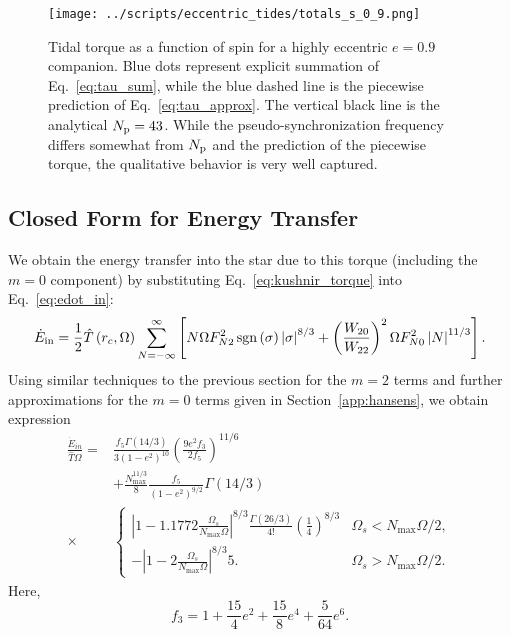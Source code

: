 \documentclass[
        fleqn,
        usenatbib,
        referee,
    ]{mnras}
\newcommand*{\abs}[1]{\left|#1\right|}
\newcommand*{\p}[1]{\left(#1\right)}
\newcommand*{\s}[1]{\left[#1\right]}
\DeclareMathOperator*{\sgn}{sgn}
\begin{document}
\begin{figure}
    \centering
    \texttt{[image: ../scripts/eccentric\_tides/totals\_s\_0\_9.png]}
    \caption{Tidal torque as a function of spin for a highly eccentric $e = 0.9$
    companion. Blue dots represent explicit summation of Eq.~\eqref{eq:tau_sum},
    while the blue dashed line is the piecewise prediction of
    Eq.~\eqref{eq:tau_approx}. The vertical black line is the analytical $N_{\rm
    p} = 43$. While the pseudo-synchronization frequency differs somewhat
    from $N_{\rm p}$ and the prediction of the piecewise torque, the
    qualitative behavior is very well captured.}\label{fig:totals_s}
\end{figure}

\subsection{Closed Form for Energy Transfer}

We obtain the energy transfer into the star due to this torque (including the $m
= 0$ component) by substituting Eq.~\eqref{eq:kushnir_torque} into
Eq.~\eqref{eq:edot_in}:
\begin{align}
     \dot{E}_{\rm in} = \frac{1}{2}\hat{T}\p{r_c, \Omega}
         \sum\limits_{N = -\infty}^\infty\s{
            N\Omega F_{N2}^2 \sgn \p{\sigma} \abs{\sigma}^{8/3}
            + \p{\frac{W_{20}}{W_{22}}}^2\Omega F_{N0}^2 \abs{N}^{11/3}}.
            \label{eq:e_sum}
\end{align}
Using similar techniques to the previous section for the $m=2$ terms and further
approximations for the $m = 0$ terms given in Section~\ref{app:hansens}, we
obtain expression
\begin{align}
    \frac{\dot{E}_{in}}{\hat{T}\Omega} ={}&
            \frac{f_5 \Gamma(14/3)}{3\p{1 - e^2}^{10}}
                \p{\frac{9e^2f_3}{2f_5}}^{11/6}\nonumber\\
        &+
            \frac{N_{\max}^{11/3}}{8}
            \frac{f_5}{\p{1 - e^2}^{9/2}}
            \Gamma\p{14/3}\nonumber\\
        \times &\begin{cases}
            \abs{1 - 1.1772\frac{\Omega_s}{N_{\max}\Omega}}^{8/3}
                \frac{\Gamma\p{26/3}}{4!}\p{\frac{1}{4}}^{8/3}
                & \Omega_s < N_{\max}\Omega/2,\\[5pt]
            -\abs{1 - 2\frac{\Omega_s}{N_{\max}\Omega}}^{8/3}5.
                & \Omega_s > N_{\max}\Omega/2.
        \end{cases}\label{eq:total_heating}
\end{align}
Here,
\begin{equation}
    f_3 = 1 + \frac{15}{4}e^2 + \frac{15}{8}e^4 + \frac{5}{64}e^6.
\end{equation}
\end{document}
